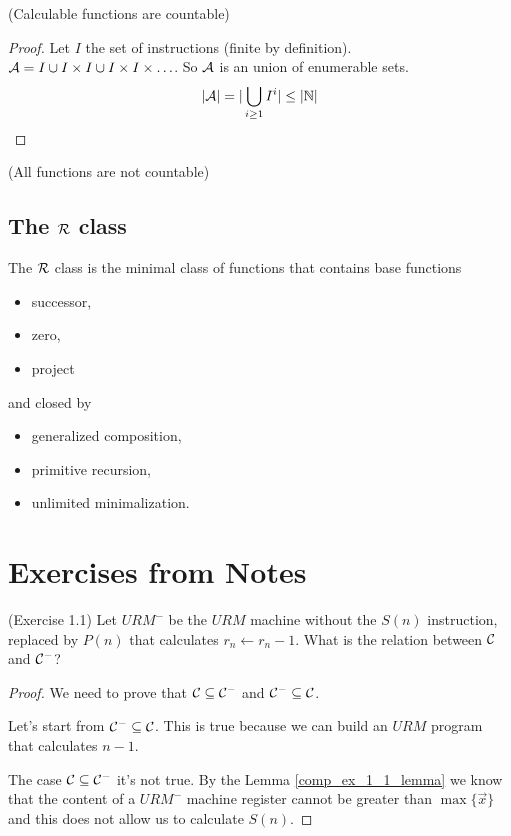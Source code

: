 \documentclass[12pt,a4paper,oneside]{book}
\begin{document}
\begin{lemma}{(Calculable functions are countable)}
    \begin{proof}
        Let $I$ the set of instructions (finite by definition). $\mathcal{A}
        = I \cup I \times I \cup I \times I \times \ldots$. So $\mathcal{A}$
        is an union of enumerable sets.
        \[
          |\mathcal{A}| = | \bigcup_{i \geq 1} I^i | \leq | \mathbb{N} |
        \]
    \end{proof}
\end{lemma}

\begin{lemma}{(All functions are not countable)}
\end{lemma}

\subsection{The  $\mathcal{R}$ class}

The $\mathcal{R}$ class is the minimal class of functions that contains base
functions
\begin{itemize}
    \item successor,
    \item zero,
    \item project
\end{itemize}
and closed by 
\begin{itemize}
    \item generalized composition,
    \item primitive recursion,
    \item unlimited minimalization.
\end{itemize}

\section{Exercises from Notes}

\begin{exercise}{(Exercise 1.1)}
    Let $URM^-$ be the $URM$ machine without the $S(n)$ instruction,
    replaced by $P(n)$ that calculates $r_n \leftarrow r_n - 1$. What
    is the relation between $\mathcal{C}$ and $\mathcal{C}^-$?
    
    \begin{proof}
        We need to prove that $\mathcal{C} \subseteq \mathcal{C}^-$ and $\mathcal{C}^-
        \subseteq \mathcal{C}$.
        
        Let's start from $\mathcal{C}^- \subseteq \mathcal{C}$. This is true
        because we can build an $URM$ program that calculates $n-1$.
        
        The case $\mathcal{C} \subseteq \mathcal{C}^-$ it's not true. By the Lemma
        \ref{comp_ex_1_1_lemma} we know that the content of a $URM^-$
        machine register cannot be greater than $\max \{ \vec{x} \}$
        and this does not allow us to calculate $S(n).$
    \end{proof}
\end{exercise}
\end{document}
